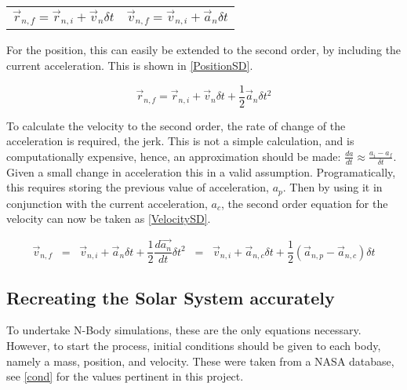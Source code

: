 \documentclass[a4paper,10pt]{article}
\begin{document}
\noindent\begin{tabularx}{\textwidth}{@{}XX@{}}
  \begin{equation*}
   \vec{r}_{n,f} =  \vec{r}_{n,i} + \vec{v}_{n} \delta t
    \label{PositionFD}
  \end{equation*} &
  \begin{equation*}
 \vec{v}_{n,f} =  \vec{v}_{n,i} + \vec{a}_{n} \delta t
    \label{VelocityFD}
  \end{equation*}
\end{tabularx}

For the position, this can easily be extended to the second order, by including the current acceleration. This is shown in \cref{PositionSD}.

\begin{equation} \label{PositionSD}
    \vec{r}_{n,f} =  \vec{r}_{n,i} + \vec{v}_{n} \delta t + \frac{1}{2}\vec{a}_{n}\delta t^2
\end{equation}

To calculate the velocity to the second order, the rate of change of the acceleration is required, the jerk. This is not a simple calculation, and is computationally expensive, hence, an approximation should be made: $\frac{da}{dt} \approx \frac{a_i - a_f}{\delta t}$. Given a small change in acceleration this in a valid assumption. Programatically, this requires storing the previous value of acceleration, $a_p$. Then by using it in conjunction with the current acceleration, $a_c$, the second order equation for the velocity can now be taken as \cref{VelocitySD}.

\begin{equation} \label{VelocitySD}
     \vec{v}_{n,f} \;\; =  \;\; \vec{v}_{n,i} + \vec{a}_{n} \delta t + \frac{1}{2}\frac{d\vec{a_n}}{dt}\delta t^2 \;\; = \;\; \vec{v}_{n,i} + \vec{a}_{n,c} \delta t + \frac{1}{2}(\vec{a}_{n,p} - \vec{a}_{n,c})\delta t
\end{equation}

\subsection{Recreating the Solar System accurately}

To undertake N-Body simulations, these are the only equations necessary. However, to start the process, initial conditions should be given to each body, namely a mass, position, and velocity. These were taken from a NASA database\cite{PlanetFacts}, see \cref{cond} for the values pertinent in this project.  
\end{document}
